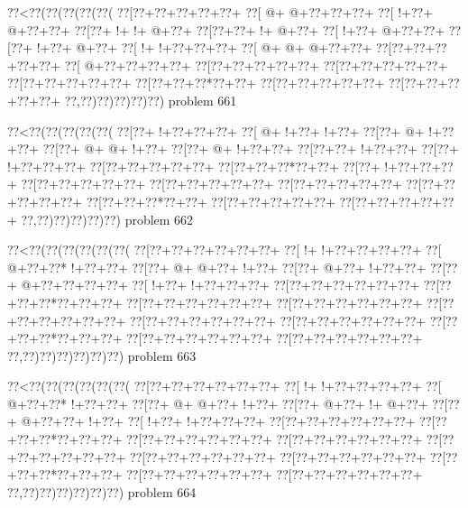 \vbox{\vbox{\goo
\0??<\0??(\0??(\0??(\0??(\0??(
\0??[\0??+\0??+\0??+\0??+\0??+
\0??[\- @+\- @+\0??+\0??+\0??+
\0??[\- !+\0??+\- @+\0??+\0??+
\0??[\0??+\- !+\- !+\- @+\0??+
\0??[\0??+\0??+\- !+\- @+\0??+
\0??[\- !+\0??+\- @+\0??+\0??+
\0??[\0??+\- !+\0??+\- @+\0??+
\0??[\- !+\- !+\0??+\0??+\0??+
\0??[\- @+\- @+\- @+\0??+\0??+
\0??[\0??+\0??+\0??+\0??+\0??+
\0??[\- @+\0??+\0??+\0??+\0??+
\0??[\0??+\0??+\0??+\0??+\0??+
\0??[\0??+\0??+\0??+\0??+\0??+
\0??[\0??+\0??+\0??+\0??+\0??+
\0??[\0??+\0??+\0??*\0??+\0??+
\0??[\0??+\0??+\0??+\0??+\0??+
\0??[\0??+\0??+\0??+\0??+\0??+
\0??,\0??)\0??)\0??)\0??)\0??)
}
\hfil problem 661\hfil\break
}

\vbox{\vbox{\goo
\0??<\0??(\0??(\0??(\0??(\0??(
\0??[\0??+\- !+\0??+\0??+\0??+
\0??[\- @+\- !+\0??+\- !+\0??+
\0??[\0??+\- @+\- !+\0??+\0??+
\0??[\0??+\- @+\- @+\- !+\0??+
\0??[\0??+\- @+\- !+\0??+\0??+
\0??[\0??+\0??+\- !+\0??+\0??+
\0??[\0??+\- !+\0??+\0??+\0??+
\0??[\0??+\0??+\0??+\0??+\0??+
\0??[\0??+\0??+\0??*\0??+\0??+
\0??[\0??+\- !+\0??+\0??+\0??+
\0??[\0??+\0??+\0??+\0??+\0??+
\0??[\0??+\0??+\0??+\0??+\0??+
\0??[\0??+\0??+\0??+\0??+\0??+
\0??[\0??+\0??+\0??+\0??+\0??+
\0??[\0??+\0??+\0??*\0??+\0??+
\0??[\0??+\0??+\0??+\0??+\0??+
\0??[\0??+\0??+\0??+\0??+\0??+
\0??,\0??)\0??)\0??)\0??)\0??)
}
\hfil problem 662\hfil\break
}

\vbox{\vbox{\goo
\0??<\0??(\0??(\0??(\0??(\0??(\0??(
\0??[\0??+\0??+\0??+\0??+\0??+\0??+
\0??[\- !+\- !+\0??+\0??+\0??+\0??+
\0??[\- @+\0??+\0??*\- !+\0??+\0??+
\0??[\0??+\- @+\- @+\0??+\- !+\0??+
\0??[\0??+\- @+\0??+\- !+\0??+\0??+
\0??[\0??+\- @+\0??+\0??+\0??+\0??+
\0??[\- !+\0??+\- !+\0??+\0??+\0??+
\0??[\0??+\0??+\0??+\0??+\0??+\0??+
\0??[\0??+\0??+\0??*\0??+\0??+\0??+
\0??[\0??+\0??+\0??+\0??+\0??+\0??+
\0??[\0??+\0??+\0??+\0??+\0??+\0??+
\0??[\0??+\0??+\0??+\0??+\0??+\0??+
\0??[\0??+\0??+\0??+\0??+\0??+\0??+
\0??[\0??+\0??+\0??+\0??+\0??+\0??+
\0??[\0??+\0??+\0??*\0??+\0??+\0??+
\0??[\0??+\0??+\0??+\0??+\0??+\0??+
\0??[\0??+\0??+\0??+\0??+\0??+\0??+
\0??,\0??)\0??)\0??)\0??)\0??)\0??)
}
\hfil problem 663\hfil\break
}

\vbox{\vbox{\goo
\0??<\0??(\0??(\0??(\0??(\0??(\0??(
\0??[\0??+\0??+\0??+\0??+\0??+\0??+
\0??[\- !+\- !+\0??+\0??+\0??+\0??+
\0??[\- @+\0??+\0??*\- !+\0??+\0??+
\0??[\0??+\- @+\- @+\0??+\- !+\0??+
\0??[\0??+\- @+\0??+\- !+\- @+\0??+
\0??[\0??+\- @+\0??+\0??+\- !+\0??+
\0??[\- !+\0??+\- !+\0??+\0??+\0??+
\0??[\0??+\0??+\0??+\0??+\0??+\0??+
\0??[\0??+\0??+\0??*\0??+\0??+\0??+
\0??[\0??+\0??+\0??+\0??+\0??+\0??+
\0??[\0??+\0??+\0??+\0??+\0??+\0??+
\0??[\0??+\0??+\0??+\0??+\0??+\0??+
\0??[\0??+\0??+\0??+\0??+\0??+\0??+
\0??[\0??+\0??+\0??+\0??+\0??+\0??+
\0??[\0??+\0??+\0??*\0??+\0??+\0??+
\0??[\0??+\0??+\0??+\0??+\0??+\0??+
\0??[\0??+\0??+\0??+\0??+\0??+\0??+
\0??,\0??)\0??)\0??)\0??)\0??)\0??)
}
\hfil problem 664\hfil\break
}

